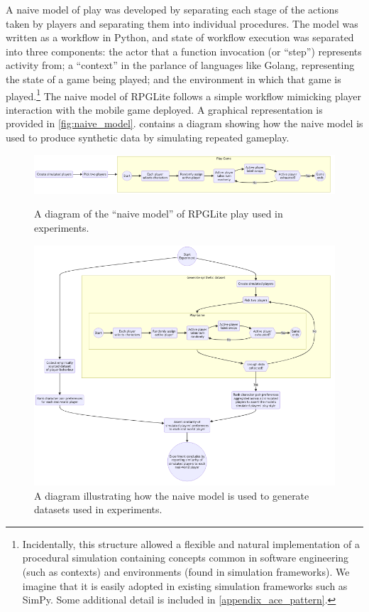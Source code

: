 A naive model of play was developed by separating each stage of the actions
taken by players and separating them into individual procedures. The model was
written as a workflow in Python, and state of workflow execution was separated
into three components: the actor that a function invocation (or ``step'')
represents activity from; a ``context'' in the parlance of languages like
Golang, representing the state of a game being played; and the environment in
which that game is played.\footnote{Incidentally, this structure allowed a
flexible and natural implementation of a procedural simulation containing
concepts common in software engineering (such as contexts) and environments
(found in simulation frameworks). We imagine that it is easily adopted in
existing simulation frameworks such as SimPy\cite{simpy_intro}. Some additional
detail is included in \cref{appendix_ace_pattern}.} The naive model of RPGLite
follows a simple workflow mimicking player interaction with the mobile game
deployed. A graphical representation is provided in \cref{fig:naive_model}.
 contains a diagram showing
how the naive model is used to produce synthetic data by simulating repeated
gameplay.

\begin{figure}[h]
  \centering
  \includegraphics[width=\columnwidth]{60_optimisation_with_aspects/diagrams/naive_model.png}
  \caption{A diagram of the ``naive model'' of RPGLite play used in experiments.}
  \label{fig:naive_model}

  \includegraphics[width=\columnwidth]{60_optimisation_with_aspects/diagrams/experiment_setup_for_datagen.png}
  \caption{A diagram illustrating how the naive model is used to generate datasets used in experiments.}
  \label{fig:naive_model_with_experimental_apparatus}
\end{figure}


